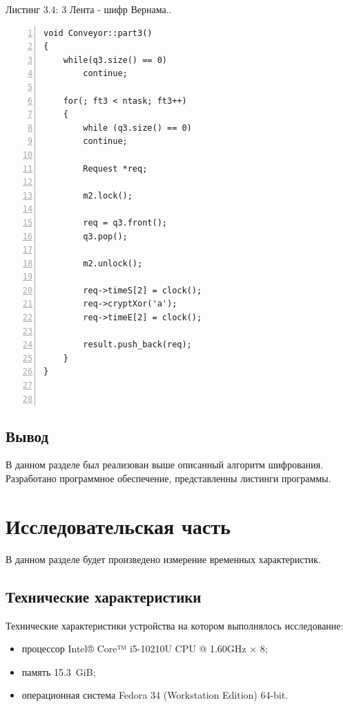 \documentclass[12pt,a4paper]{report}
\begin{document}
\noindent\textrm{Листинг 3.4: 3 Лента - шифр Вернама..}
\begin{lstlisting}[frame=single, numbers=left]
void Conveyor::part3()
{
    while(q3.size() == 0)
        continue;
	
    for(; ft3 < ntask; ft3++)
    {
        while (q3.size() == 0)
        continue;
		
        Request *req;
		
        m2.lock();
		
        req = q3.front();
        q3.pop();
		
        m2.unlock();
		
        req->timeS[2] = clock();
        req->cryptXor('a');
        req->timeE[2] = clock();
		
        result.push_back(req);
    }
}	
	
	
\end{lstlisting}	

\section*{Вывод}
В данном разделе был реализован выше описанный алгоритм шифрования. Разработано программное обеспечение, представленны листинги программы.

\newpage
\chapter{Исследовательская часть} 

В данном разделе будет произведено измерение временных характеристик.

\section{Технические характеристики}

\begin{figure}[ht]
\end{figure}

Технические характеристики устройства на котором выполнялось исследование:
\begin{itemize}
	\item процессор Intel® Core™ i5-10210U CPU @ 1.60GHz × 8;
	\item память 15.3 GiB;
	\item операционная система Fedora 34 (Workstation Edition) 64-bit.
\end{itemize}
\end{document}
